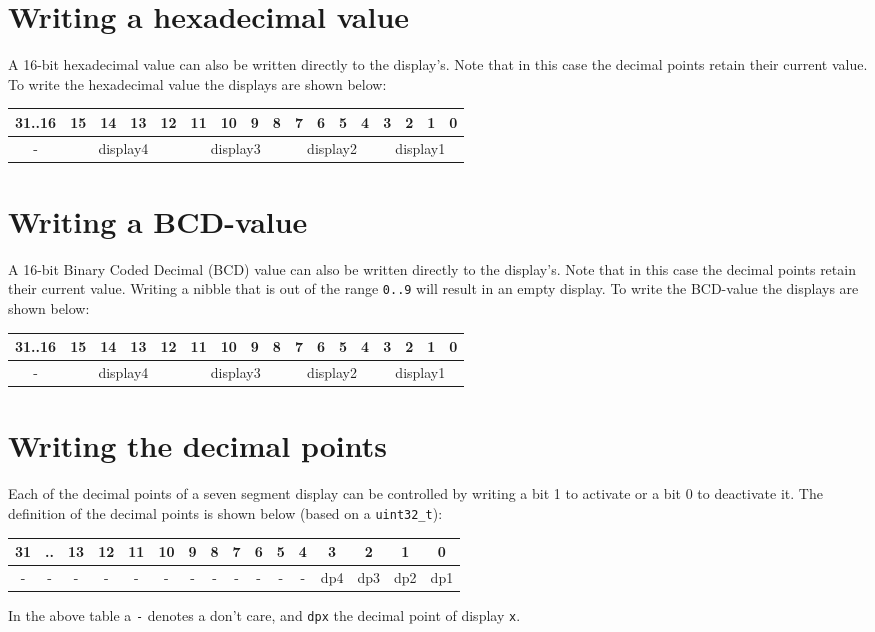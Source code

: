 \documentclass[a4paper,twoside,12pt]{article}
\begin{document}
\section{Writing a hexadecimal value}
A 16-bit hexadecimal value can also be written directly to the display's. Note that in this case the decimal points retain their current value. To write the hexadecimal value the displays are shown below:
\begin{center}
\begin{tabular}{|c|c|c|c|c|c|c|c|c|c|c|c|c|c|c|c|c|}
\hline
31..16&15&14&13&12&11&10&9&8&7&6&5&4&3&2&1&0\\
\hline
\hline
-&\multicolumn{4}{|c}{display4}&\multicolumn{4}{|c}{display3}&\multicolumn{4}{|c}{display2}&\multicolumn{4}{|c|}{display1}\\
\hline
\end{tabular}
\end{center}
\section{Writing a BCD-value}
A 16-bit Binary Coded Decimal (BCD) value can also be written directly to the display's. Note that in this case the decimal points retain their current value. Writing a nibble that is out of the range \texttt{0..9} will result in an empty display. To write the BCD-value the displays are shown below:
\begin{center}
\begin{tabular}{|c|c|c|c|c|c|c|c|c|c|c|c|c|c|c|c|c|}
\hline
31..16&15&14&13&12&11&10&9&8&7&6&5&4&3&2&1&0\\
\hline
\hline
-&\multicolumn{4}{|c}{display4}&\multicolumn{4}{|c}{display3}&\multicolumn{4}{|c}{display2}&\multicolumn{4}{|c|}{display1}\\
\hline
\end{tabular}
\end{center}
\section{Writing the decimal points}
Each of the decimal points of a seven segment display can be controlled by writing a bit 1 to activate or a bit 0 to deactivate it. The definition of the decimal points is shown below (based on a \texttt{uint32\_t}):
\begin{center}
\begin{tabular}{|c|c|c|c|c|c|c|c|c|c|c|c|c|c|c|c|}
\hline
31&..&13&12&11&10&9&8&7&6&5&4&3&2&1&0\\
\hline
\hline
-&-&-&-&-&-&-&-&-&-&-&-&dp4&dp3&dp2&dp1\\
\hline
\end{tabular}
\end{center}
In the above table a \texttt{-} denotes a don't care, and \texttt{dpx} the decimal point of display \texttt{x}.
\end{document}
